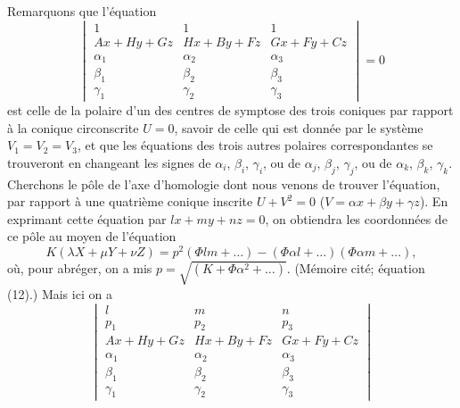 \documentclass[12pt,a4paper]{article}
\theoremstyle{definition}
\begin{document}
Remarquons que l'\'{e}quation
\begin{equation}\tag{5}
\begin{vmatrix}
1 & 1 & 1 \\
Ax + Hy + Gz & Hx + By + Fz & Gx + Fy + Cz \\
\alpha_1 & \alpha_2 & \alpha_3 \\
\beta_1 & \beta_2 & \beta_3 \\
\gamma_1 & \gamma_2 & \gamma_3
\end{vmatrix} = 0
\end{equation}
est celle de la polaire d'un des centres de symptose des trois coniques par rapport \`{a} la conique circonscrite $U = 0$, savoir de celle qui est donn\'{e}e par le syst\`{e}me $V_1 = V_2 = V_3$, et que les \'{e}quations des trois autres polaires correspondantes se trouveront en changeant les signes de $\alpha_i$, $\beta_i$, $\gamma_i$, ou de $\alpha_j$, $\beta_j$, $\gamma_j$, ou de $\alpha_k$, $\beta_k$, $\gamma_k$.
Cherchons le p\^{o}le de l'axe d'homologie dont nous venons de trouver l'\'{e}quation, par rapport \`{a} une quatri\`{e}me conique inscrite $U + V^2 = 0$ ($V = \alpha x + \beta y + \gamma z$). En exprimant cette \'{e}quation par $lx + my + nz = 0$, on obtiendra les coordonn\'{e}es de ce p\^{o}le au moyen de l'\'{e}quation
\begin{equation}\tag{6}
K(\lambda X + \mu Y + \nu Z) = p^2(\Phi lm + \ldots) - (\Phi \alpha l + \ldots)(\Phi \alpha m + \ldots),
\end{equation}
o\`{u}, pour abr\'{e}ger, on a mis $p = \sqrt{(K + \Phi\alpha^2 + \ldots)}$. (M\'{e}moire cit\'{e}; \'{e}quation (12).) Mais ici on a
\[
\begin{vmatrix}
l & m & n \\
p_1 & p_2 & p_3 \\
Ax + Hy + Gz & Hx + By + Fz & Gx + Fy + Cz \\
\alpha_1 & \alpha_2 & \alpha_3 \\
\beta_1 & \beta_2 & \beta_3 \\
\gamma_1 & \gamma_2 & \gamma_3
\end{vmatrix}
\]
\end{document}
